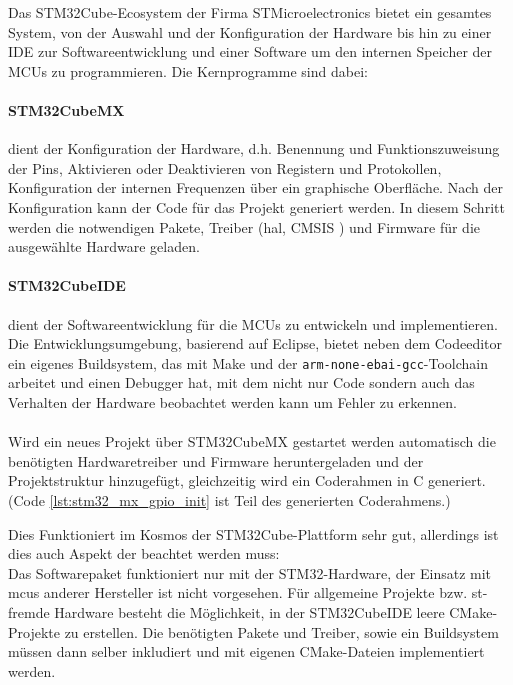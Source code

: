 Das STM32Cube-Ecosystem \cite{stm32cube_ecosystem} der Firma STMicroelectronics bietet ein gesamtes System, von der Auswahl und der Konfiguration der Hardware bis hin zu einer IDE zur Softwareentwicklung und einer Software um den internen Speicher der MCUs zu programmieren.
Die Kernprogramme sind dabei:

\paragraph{STM32CubeMX} 
	dient der Konfiguration der Hardware, d.h. Benennung und Funktionszuweisung der Pins, Aktivieren oder Deaktivieren von Registern und Protokollen, Konfiguration der internen Frequenzen über ein graphische Oberfläche.
	Nach der Konfiguration kann der Code für das Projekt generiert werden.
	In diesem Schritt werden die notwendigen Pakete, Treiber (\gls{hal}, CMSIS %
	) und Firmware für die ausgewählte Hardware geladen. \cite{stm32cubemx}

\paragraph{STM32CubeIDE}
	dient der Softwareentwicklung für die MCUs zu entwickeln und implementieren.
	Die Entwicklungsumgebung, basierend auf Eclipse, bietet neben dem Codeeditor ein eigenes Buildsystem, das mit Make und der \texttt{arm-none-ebai-gcc}-Toolchain arbeitet und einen Debugger hat, mit dem nicht nur Code sondern auch das Verhalten der Hardware beobachtet werden kann um Fehler zu erkennen. \cite{stm32cubeide}
\\
\\
Wird ein neues Projekt über STM32CubeMX gestartet werden automatisch die benötigten Hardwaretreiber und Firmware heruntergeladen und der Projektstruktur hinzugefügt, gleichzeitig wird ein Coderahmen in C generiert. (Code \ref{lst:stm32_mx_gpio_init} ist Teil des generierten Coderahmens.)

Dies Funktioniert im Kosmos der STM32Cube-Plattform sehr gut, allerdings ist dies auch Aspekt der beachtet werden muss:\\
Das Softwarepaket funktioniert nur mit der STM32-Hardware, der Einsatz mit \gls{mcu}s anderer Hersteller ist nicht vorgesehen.
Für allgemeine Projekte bzw. st-fremde Hardware besteht die Möglichkeit, in der STM32CubeIDE leere CMake-Projekte zu erstellen.
Die benötigten Pakete und Treiber, sowie ein Buildsystem müssen dann selber inkludiert und mit eigenen CMake-Dateien implementiert werden.


